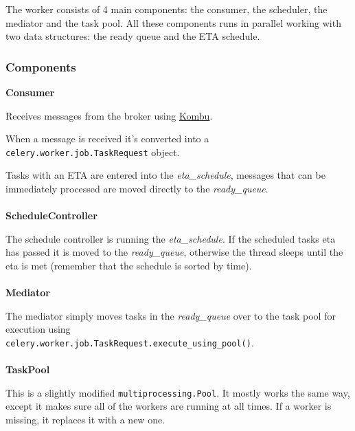 \documentclass[9pt,a4paper]{article}
\begin{document}
\begin{CJK*}{GBK}{kai}
The worker consists of 4 main components: the consumer, the scheduler, the mediator and the task pool. All these components runs in parallel working with two data structures: the ready queue and the ETA schedule.

\subsubsection{Components}

\noindent\textbf{Consumer}

Receives messages from the broker using \href{https://pypi.python.org/pypi/kombu}{Kombu}.

When a message is received it\textquoteright s converted into a \verb"celery.worker.job.TaskRequest" object.

Tasks with an ETA are entered into the \textit{eta\_schedule}, messages that can be immediately processed are moved directly to the \textit{ready\_queue}.
\\\\
\textbf{ScheduleController}

The schedule controller is running the \textit{eta\_schedule}. If the scheduled tasks eta has passed it is moved to the \textit{ready\_queue}, otherwise the thread sleeps until the eta is met (remember that the schedule is sorted by time).
\\\\
\textbf{Mediator}

The mediator simply moves tasks in the \textit{ready\_queue} over to the task pool for execution using \\\verb"celery.worker.job.TaskRequest.execute_using_pool()".
\\\\
\textbf{TaskPool}

This is a slightly modified \verb"multiprocessing.Pool". It mostly works the same way, except it makes sure all of the workers are running at all times. If a worker is missing, it replaces it with a new one.

\end{CJK*}
\end{document}

